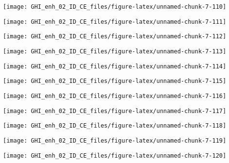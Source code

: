 \documentclass[
  10pt,
  a4paper,oneside]{article}
\begin{document}
\begin{center}\texttt{[image: GHI\_enh\_02\_ID\_CE\_files/figure-latex/unnamed-chunk-7-110]} \end{center}

\begin{center}\texttt{[image: GHI\_enh\_02\_ID\_CE\_files/figure-latex/unnamed-chunk-7-111]} \end{center}

\begin{center}\texttt{[image: GHI\_enh\_02\_ID\_CE\_files/figure-latex/unnamed-chunk-7-112]} \end{center}

\begin{center}\texttt{[image: GHI\_enh\_02\_ID\_CE\_files/figure-latex/unnamed-chunk-7-113]} \end{center}

\begin{center}\texttt{[image: GHI\_enh\_02\_ID\_CE\_files/figure-latex/unnamed-chunk-7-114]} \end{center}

\begin{center}\texttt{[image: GHI\_enh\_02\_ID\_CE\_files/figure-latex/unnamed-chunk-7-115]} \end{center}

\begin{center}\texttt{[image: GHI\_enh\_02\_ID\_CE\_files/figure-latex/unnamed-chunk-7-116]} \end{center}

\begin{center}\texttt{[image: GHI\_enh\_02\_ID\_CE\_files/figure-latex/unnamed-chunk-7-117]} \end{center}

\begin{center}\texttt{[image: GHI\_enh\_02\_ID\_CE\_files/figure-latex/unnamed-chunk-7-118]} \end{center}

\begin{center}\texttt{[image: GHI\_enh\_02\_ID\_CE\_files/figure-latex/unnamed-chunk-7-119]} \end{center}

\begin{center}\texttt{[image: GHI\_enh\_02\_ID\_CE\_files/figure-latex/unnamed-chunk-7-120]} \end{center}
\end{document}
